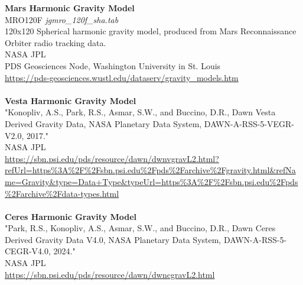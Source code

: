 \documentclass[Orbiter User Manual.tex]{subfiles}
\begin{document}
\textbf{Mars Harmonic Gravity Model}\\
MRO120F	\textit{jgmro\_120f\_sha.tab}\\
120x120 Spherical harmonic gravity model, produced from Mars Reconnaissance Orbiter radio tracking data.\\
NASA JPL\\
PDS Geosciences Node, Washington University in St. Louis\\
\url{https://pds-geosciences.wustl.edu/dataserv/gravity_models.htm}\\
\\
\textbf{Vesta Harmonic Gravity Model}\\
"Konopliv, A.S., Park, R.S., Asmar, S.W., and Buccino, D.R., Dawn Vesta Derived Gravity Data, NASA Planetary Data System, DAWN-A-RSS-5-VEGR-V2.0, 2017."\\
NASA JPL\\
\url{https://sbn.psi.edu/pds/resource/dawn/dwnvgravL2.html?refUrl=https\%3A\%2F\%2Fsbn.psi.edu\%2Fpds\%2Farchive\%2Fgravity.html&refName=Gravity&type=Data+Type&typeUrl=https\%3A\%2F\%2Fsbn.psi.edu\%2Fpds\%2Farchive\%2Fdata-types.html}\\
\\
\textbf{Ceres Harmonic Gravity Model}\\
"Park, R.S., Konopliv, A.S., Asmar, S.W., and Buccino, D.R., Dawn Ceres Derived Gravity Data V4.0, NASA Planetary Data System, DAWN-A-RSS-5-CEGR-V4.0, 2024."\\
NASA JPL\\
\url{https://sbn.psi.edu/pds/resource/dawn/dwncgravL2.html}\\
\\
\end{document}
